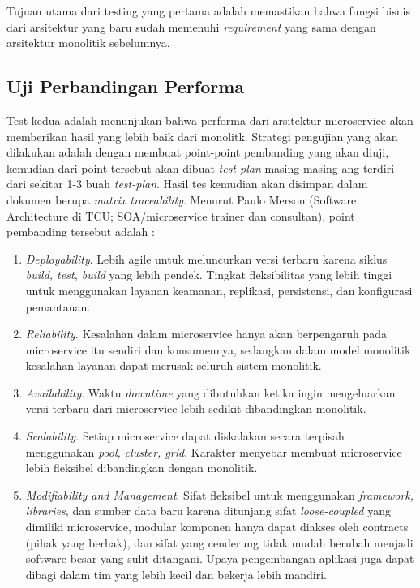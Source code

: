 Tujuan utama dari testing yang pertama adalah memastikan bahwa fungsi bisnis dari arsitektur yang baru sudah memenuhi \textit{requirement} yang sama dengan arsitektur monolitik sebelumnya.
\subsection{Uji Perbandingan Performa}
Test kedua adalah menunjukan bahwa performa dari arsitektur microservice akan memberikan hasil yang lebih baik dari monolitk. Strategi pengujian yang akan dilakukan adalah dengan membuat point-point pembanding yang akan diuji, kemudian dari point tersebut akan dibuat \textit{test-plan} masing-masing ang terdiri dari sekitar 1-3 buah \textit{test-plan}. Hasil tes kemudian akan disimpan dalam dokumen berupa \textit{matrix traceability}.
Menurut Paulo Merson (Software Architecture di TCU; SOA/microservice trainer dan consultan), point pembanding tersebut adalah \cite{12}:
\begin{enumerate}[leftmargin=*]
	\item \textit{Deployability}. Lebih agile untuk meluncurkan versi terbaru karena siklus \textit{build, test, build} yang lebih pendek. Tingkat fleksibilitas yang lebih tinggi untuk menggunakan layanan keamanan, replikasi, persistensi, dan konfigurasi pemantauan.
	\item \textit{Reliability}. Kesalahan dalam microservice hanya akan berpengaruh pada microservice itu sendiri dan konsumennya, sedangkan dalam model monolitik kesalahan layanan dapat merusak seluruh sistem monolitik.
	\item \textit{Availability}. Waktu \textit{downtime} yang dibutuhkan ketika ingin mengeluarkan versi terbaru dari microservice lebih sedikit dibandingkan monolitik.
	\item \textit{Scalability}. Setiap microservice dapat diskalakan secara terpisah menggunakan \textit{pool, cluster, grid}. Karakter menyebar membuat microservice lebih fleksibel dibandingkan dengan monolitik.
	\item \textit{Modifiability and Management}. Sifat fleksibel untuk menggunakan \textit{framework, libraries}, dan sumber data baru karena ditunjang sifat \textit{loose-coupled} yang dimiliki microservice, modular komponen hanya dapat diakses oleh contracts (pihak yang berhak), dan sifat yang cenderung tidak mudah berubah menjadi software besar yang sulit ditangani. Upaya pengembangan aplikasi juga dapat dibagi dalam tim yang lebih kecil dan bekerja lebih mandiri. 
\end{enumerate}
\newpage